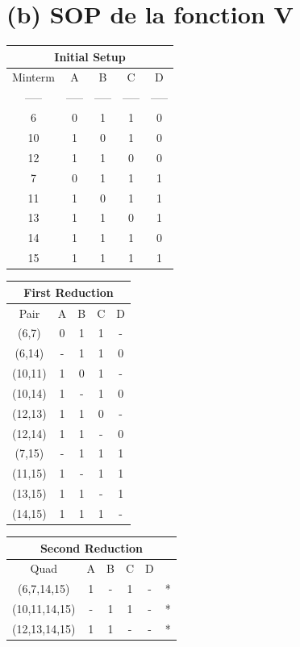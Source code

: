 \documentclass{article}
\begin{document}
\section*{(b) SOP de la fonction V}
\begin{tabular}{|c|c|c|c|c|}
    \hline
    \multicolumn{5}{|c|}{Initial Setup}     \\
    \hline
    Minterm & A     & B     & C     & D     \\
    \hline
    -----   & ----- & ----- & ----- & ----- \\
    \hline
    6       & 0     & 1     & 1     & 0     \\
    10      & 1     & 0     & 1     & 0     \\
    12      & 1     & 1     & 0     & 0     \\
    \hline
    7       & 0     & 1     & 1     & 1     \\
    11      & 1     & 0     & 1     & 1     \\
    13      & 1     & 1     & 0     & 1     \\
    14      & 1     & 1     & 1     & 0     \\
    \hline
    15      & 1     & 1     & 1     & 1     \\
    \hline
\end{tabular}
\quad
\begin{tabular}{|ccccc|}
    \hline
    \multicolumn{5}{|c|}{First Reduction} \\
    \hline
    Pair    & A & B & C & D               \\
    \hline
    (6,7)   & 0 & 1 & 1 & -               \\
    (6,14)  & - & 1 & 1 & 0               \\
    (10,11) & 1 & 0 & 1 & -               \\
    (10,14) & 1 & - & 1 & 0               \\
    (12,13) & 1 & 1 & 0 & -               \\
    (12,14) & 1 & 1 & - & 0               \\
    \hline
    (7,15)  & - & 1 & 1 & 1               \\
    (11,15) & 1 & - & 1 & 1               \\
    (13,15) & 1 & 1 & - & 1               \\
    (14,15) & 1 & 1 & 1 & -               \\
    \hline
\end{tabular}
\quad
\begin{tabular}{|cccccc|}
    \hline
    \multicolumn{6}{|c|}{Second Reduction} \\
    \hline
    Quad          & A & B & C & D &        \\
    \hline
    (6,7,14,15)   & 1 & - & 1 & - & *      \\
    (10,11,14,15) & - & 1 & 1 & - & *      \\
    (12,13,14,15) & 1 & 1 & - & - & *      \\
    \hline
\end{tabular}
\end{document}
